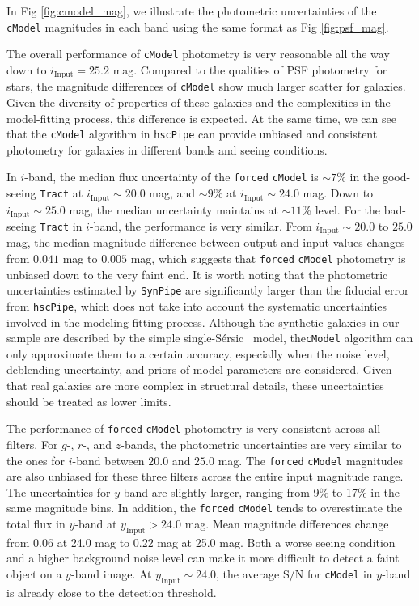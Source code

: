\documentclass[useamsfonts]{pasj01}
\def\ser{{S\'{e}rsic\ }}
\def\hscpipe{\texttt{hscPipe}}
\def\synpipe{\texttt{SynPipe}}
\def\cmodel{\texttt{cModel}}
\def\forced{\texttt{forced}}
\def\tract{\texttt{Tract}}
\def\s2n{{$\mathrm{S}/\mathrm{N}$}}
\newcommand{\plus}{\raisebox{.4\height}{\scalebox{.6}{+}}}
\newcommand{\minus}{\raisebox{.4\height}{\scalebox{.8}{-}}}
\begin{document}
    In Fig \ref{fig:cmodel_mag}, we illustrate the photometric uncertainties of the 
    \cmodel{} magnitudes in each band using the same format as 
    Fig \ref{fig:psf_mag}.
    
    The overall performance of \cmodel{} photometry is very reasonable all the way 
    down to $i_{\mathrm{Input}}=25.2$ mag. 
    Compared to the qualities of PSF photometry for stars, the magnitude differences
    of \cmodel{} show much larger scatter for galaxies. 
    Given the diversity of properties of these galaxies and the complexities in the 
    model-fitting process, this difference is expected.  
    At the same time, we can see that the \cmodel{} algorithm in \hscpipe{} can 
    provide unbiased and consistent photometry for galaxies in different bands and 
    seeing conditions. 
    
    In $i$-band, the median flux uncertainty of the \forced{} \cmodel{} is ${\sim}7$\% 
    in the good-seeing \tract{} at $i_{\mathrm{Input}}{\sim}20.0$ mag, 
    and ${\sim}9$\% at $i_{\mathrm{Input}}{\sim}24.0$ mag.  
    Down to $i_{\mathrm{Input}}{\sim}25.0$ mag, the median uncertainty maintains 
    at ${\sim}11$\% level. 
    For the bad-seeing \tract{} in $i$-band, the performance is very similar. 
    From $i_{\mathrm{Input}}{\sim}20.0$ to $25.0$ mag, the median magnitude difference
    between output and input values changes from \plus{}$0.041$ mag to 
    \minus{}$0.005$ mag, which suggests that \forced{} \cmodel{} photometry is 
    unbiased down to the very faint end. 
    It is worth noting that the photometric uncertainties estimated by \synpipe{}
    are significantly larger than the fiducial error from \hscpipe{}, which does not 
    take into account the systematic uncertainties involved in the modeling 
    fitting process. 
    Although the synthetic galaxies in our sample are described by the simple single-\ser{} 
    model, the\cmodel{} algorithm can only approximate them to a certain accuracy, 
    especially when the noise level, deblending uncertainty, and priors of model 
    parameters are considered. 
    Given that real galaxies are more complex in structural details, these 
    uncertainties should be treated as lower limits. 
    
    The performance of \forced{} \cmodel{} photometry is very consistent across all
    filters. 
    For $g$-, $r$-, and $z$-bands, the photometric uncertainties are very similar to 
    the ones for $i$-band between $20.0$ and $25.0$ mag. 
    The \forced{} \cmodel{} magnitudes are also unbiased for these three filters 
    across the entire input magnitude range. 
    The uncertainties for $y$-band are slightly larger, ranging from 9\% to 17\% in the 
    same magnitude bins. 
    In addition, the \forced{} \cmodel{} tends to overestimate the total flux in $y$-band
    at $y_{\mathrm{Input}}>24.0$ mag. 
    Mean magnitude differences change from \minus{}0.06 at 24.0 mag to \minus{}0.22
    mag at 25.0 mag.  
    Both a worse seeing condition and a higher background noise level can make it more 
    difficult to detect a faint object on a $y$-band image.
    At $y_{\mathrm{Input}}{\sim}24.0$, the average \s2n{} for \cmodel{} in $y$-band
    is already close to the detection threshold. 
    
\end{document}
